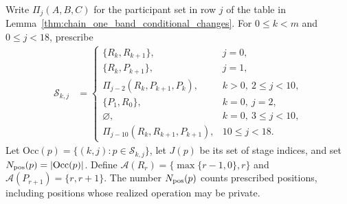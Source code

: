\begin{definition}
    \label{def:chain_stage_participants}
    \leanok
    Write $\Pi_j(A,B,C)$ for the participant set in row $j$ of the table
    in Lemma~\ref{thm:chain_one_band_conditional_changes}.
    For $0\le k<m$ and $0\le j<18$, prescribe
    \begin{align}
        \mathcal S_{k,j} & =
        \begin{cases}
            \{R_k,R_{k+1}\},                 & j=0,             \\
            \{R_k,P_{k+1}\},                 & j=1,             \\
            \Pi_{j-2}(R_k,P_{k+1},P_k),      & k>0,\ 2\le j<10, \\
            \{P_1,R_0\},                     & k=0,\ j=2,       \\
            \varnothing,                     & k=0,\ 3\le j<10, \\
            \Pi_{j-10}(R_k,R_{k+1},P_{k+1}), & 10\le j<18.
        \end{cases}
        \label{eq:chain_stage_participants}
    \end{align}
    Let $\mathrm{Occ}(p)=\{(k,j):p\in\mathcal S_{k,j}\}$,
    let $J(p)$ be its set of stage indices, and set
    $N_{\rm pos}(p)=|\mathrm{Occ}(p)|$.
    Define $\mathcal A(R_r)=\{\max\{r-1,0\},r\}$ and
    $\mathcal A(P_{r+1})=\{r,r+1\}$.
    The number $N_{\rm pos}(p)$ counts prescribed positions, including
    positions whose realized operation may be private.
\end{definition}

